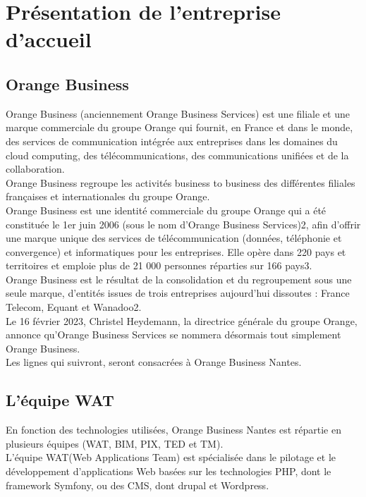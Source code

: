 \chapter{Présentation de l'entreprise d'accueil}
\section{Orange Business}
	Orange Business (anciennement Orange Business Services) est une filiale et une marque commerciale du groupe Orange qui fournit, en France et dans le monde, des services de communication intégrée aux entreprises dans les domaines du cloud computing, des télécommunications, des communications unifiées et de la collaboration.\\
	Orange Business regroupe les activités business to business des différentes filiales françaises et internationales du groupe Orange.\cite{orange_business}\\
	
	Orange Business est une identité commerciale du groupe Orange qui a été constituée le 1er juin 2006 (sous le nom d'Orange Business Services)2, afin d'offrir une marque unique des services de télécommunication (données, téléphonie et convergence) et informatiques pour les entreprises. Elle opère dans 220 pays et territoires et emploie plus de 21 000 personnes réparties sur 166 pays3.\\
	
	Orange Business est le résultat de la consolidation et du regroupement sous une seule marque, d’entités issues de trois entreprises aujourd’hui dissoutes : France Telecom, Equant et Wanadoo2.\\
	
	Le 16 février 2023, Christel Heydemann, la directrice générale du groupe Orange, annonce qu'Orange Business Services se nommera désormais tout simplement Orange Business.\cite{orange_business}\\
	
	Les lignes qui suivront, seront consacrées à Orange Business Nantes.
	
\section{L'équipe WAT} %
	En fonction des technologies utilisées, Orange Business Nantes est répartie en plusieurs équipes (WAT, BIM, PIX, TED et TM).\\
	
	L'équipe WAT(Web Applications Team) est spécialisée dans le pilotage et le développement d'applications Web basées sur les technologies PHP, dont le framework Symfony, ou des CMS, dont drupal et Wordpress.\\
	

